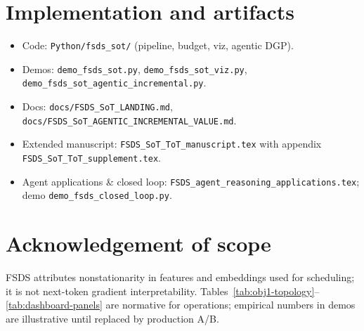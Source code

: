 \documentclass[11pt]{article}
\begin{document}
\section{Implementation and artifacts}
\label{sec:impl}

\begin{itemize}[leftmargin=*]
  \item Code: \texttt{Python/fsds\_sot/} (pipeline, budget, viz, agentic DGP).
  \item Demos: \texttt{demo\_fsds\_sot.py}, \texttt{demo\_fsds\_sot\_viz.py},
  \texttt{demo\_fsds\_sot\_agentic\_incremental.py}.
  \item Docs: \texttt{docs/FSDS\_SoT\_LANDING.md},
  \texttt{docs/FSDS\_SoT\_AGENTIC\_INCREMENTAL\_VALUE.md}.
  \item Extended manuscript: \texttt{FSDS\_SoT\_ToT\_manuscript.tex} with appendix
  \texttt{FSDS\_SoT\_ToT\_supplement.tex}.
  \item Agent applications \& closed loop: \texttt{FSDS\_agent\_reasoning\_applications.tex};
  demo \texttt{demo\_fsds\_closed\_loop.py}.
\end{itemize}





\section*{Acknowledgement of scope}
FSDS attributes nonstationarity in features and embeddings used for scheduling;
it is not next-token gradient interpretability. Tables~\ref{tab:obj1-topology}--\ref{tab:dashboard-panels}
are normative for operations; empirical numbers in demos are illustrative until
replaced by production A/B.
\end{document}
